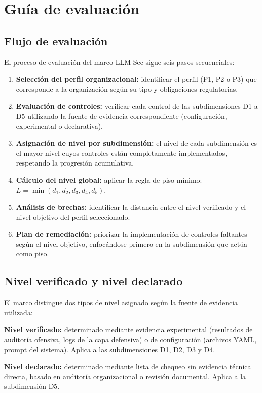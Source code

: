 \chapter{Guía de evaluación}
\label{ch:guia}

\section{Flujo de evaluación}
\label{sec:flujo-evaluacion}

El proceso de evaluación del marco LLM-Sec sigue seis pasos secuenciales:

\begin{enumerate}[leftmargin=2em]
  \item \textbf{Selección del perfil organizacional:} identificar el perfil (P1, P2 o P3) que corresponde a la organización según su tipo y obligaciones regulatorias.
  \item \textbf{Evaluación de controles:} verificar cada control de las subdimensiones D1 a D5 utilizando la fuente de evidencia correspondiente (configuración, experimental o declarativa).
  \item \textbf{Asignación de nivel por subdimensión:} el nivel de cada subdimensión es el mayor nivel cuyos controles están completamente implementados, respetando la progresión acumulativa.
  \item \textbf{Cálculo del nivel global:} aplicar la regla de piso mínimo: $L = \min(d_1, d_2, d_3, d_4, d_5)$.
  \item \textbf{Análisis de brechas:} identificar la distancia entre el nivel verificado y el nivel objetivo del perfil seleccionado.
  \item \textbf{Plan de remediación:} priorizar la implementación de controles faltantes según el nivel objetivo, enfocándose primero en la subdimensión que actúa como piso.
\end{enumerate}



\section{Nivel verificado y nivel declarado}
\label{sec:verificado-declarado}

El marco distingue dos tipos de nivel asignado según la fuente de evidencia utilizada:

\begin{infobox}
  \textbf{Nivel verificado:} determinado mediante evidencia experimental (resultados de auditoría ofensiva, logs de la capa defensiva) o de configuración (archivos YAML, prompt del sistema). Aplica a las subdimensiones D1, D2, D3 y D4.

  \textbf{Nivel declarado:} determinado mediante lista de chequeo sin evidencia técnica directa, basado en auditoría organizacional o revisión documental. Aplica a la subdimensión D5.
\end{infobox}

